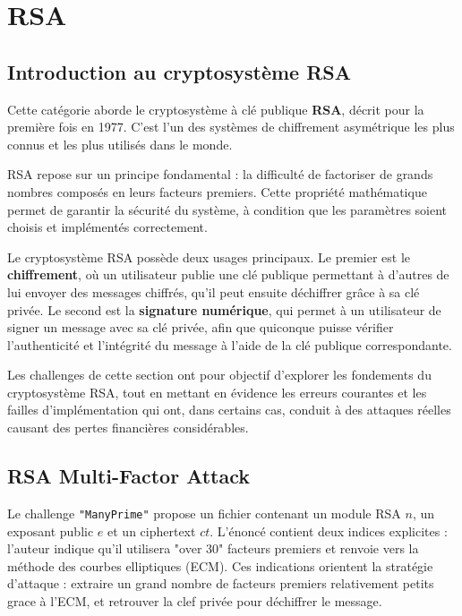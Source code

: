     \section{RSA}
    \subsection{Introduction au cryptosystème RSA}
    Cette catégorie aborde le cryptosystème à clé publique \textbf{RSA}, 
    décrit pour la première fois en 1977. C’est l’un des systèmes de chiffrement 
    asymétrique les plus connus et les plus utilisés dans le monde. 
    
    RSA repose sur un principe fondamental : la difficulté de factoriser de 
    grands nombres composés en leurs facteurs premiers. Cette propriété 
    mathématique permet de garantir la sécurité du système, à condition que les 
    paramètres soient choisis et implémentés correctement.
    
    Le cryptosystème RSA possède deux usages principaux. Le premier est le 
    \textbf{chiffrement}, où un utilisateur publie une clé publique permettant à 
    d’autres de lui envoyer des messages chiffrés, qu’il peut ensuite déchiffrer 
    grâce à sa clé privée. Le second est la \textbf{signature numérique}, qui 
    permet à un utilisateur de signer un message avec sa clé privée, afin que 
    quiconque puisse vérifier l’authenticité et l’intégrité du message à l’aide 
    de la clé publique correspondante.
    
    Les challenges de cette section ont pour objectif d’explorer les fondements 
    du cryptosystème RSA, tout en mettant en évidence les erreurs courantes et 
    les failles d’implémentation qui ont, dans certains cas, conduit à des 
    attaques réelles causant des pertes financières considérables.

    \subsection{RSA Multi-Factor Attack}
    Le challenge \texttt{"ManyPrime"} propose un fichier contenant un module RSA $n$, un exposant public $e$ et un ciphertext $ct$. L'énoncé contient deux indices explicites : l'auteur indique qu'il utilisera "over 30" facteurs premiers et renvoie vers la méthode des courbes elliptiques (ECM). Ces indications orientent la stratégie d'attaque : extraire un grand nombre de facteurs premiers relativement petits grace à l'ECM, et retrouver la clef privée pour déchiffrer le message.
    
